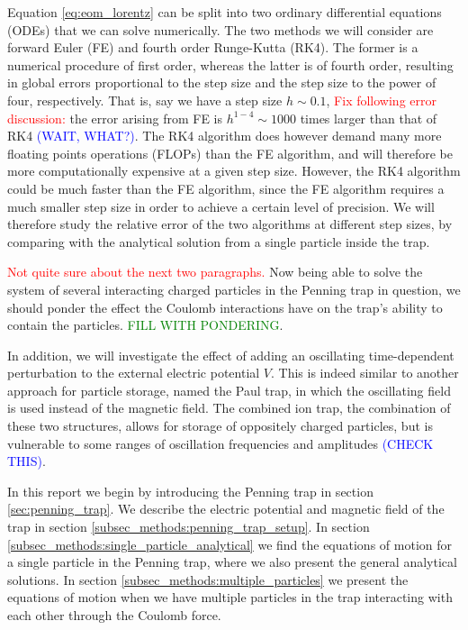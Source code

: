 Equation \eqref{eq:eom_lorentz} can be split into two ordinary differential equations (ODEs) that we can solve numerically. The two methods we will consider are forward Euler (FE) and fourth order Runge-Kutta (RK4). The former is a numerical procedure of first order, whereas the latter is of fourth order, resulting in global errors proportional to the step size and the step size to the power of four, respectively. That is, say we have a step size $h\sim 0.1$, \textcolor{red}{Fix following error discussion:} the error arising from FE is $h^{1-4} \sim 1000$ times larger than that of RK4 \textcolor{blue}{(WAIT, WHAT?)}. The RK4 algorithm does however demand many more floating points operations (FLOPs) than the FE algorithm, and will therefore be more computationally expensive at a given step size. However, the RK4 algorithm could be much faster than the FE algorithm, since the FE algorithm requires a much smaller step size in order to achieve a certain level of precision. We will therefore study the relative error of the two algorithms at different step sizes, by comparing with the analytical solution from a single particle inside the trap.          





\textcolor{red}{Not quite sure about the next two paragraphs.}
Now being able to solve the system of several interacting charged particles in the Penning trap in question, we should ponder the effect the Coulomb interactions have on the trap's ability to contain the particles. 
\textcolor{green}{FILL WITH PONDERING}. 

In addition, we will investigate the effect of adding an oscillating time-dependent perturbation to the external electric potential $V$. This is indeed similar to another approach for particle storage, named the Paul trap, in which the oscillating field is used instead of the magnetic field. The combined ion trap, the combination of these two structures, allows for storage of oppositely charged particles, but is vulnerable to some ranges of oscillation frequencies and amplitudes \textcolor{blue}{(CHECK THIS)}.


In this report we begin by introducing the Penning trap in section \ref{sec:penning_trap}. We describe the electric potential and magnetic field of the trap in section \ref{subsec_methods:penning_trap_setup}. In section \ref{subsec_methods:single_particle_analytical} we find the equations of motion for a single particle in the Penning trap, where we also present the general analytical solutions. In section \ref{subsec_methods:multiple_particles} we present the equations of motion when we have multiple particles in the trap interacting with each other through the Coulomb force. 


